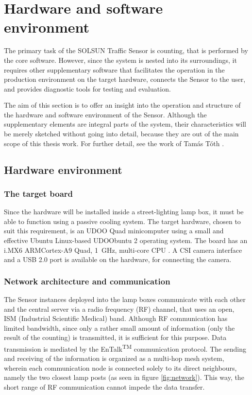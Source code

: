 \chapter{Hardware and software environment}\label{chap:Environment}
The primary task of the SOLSUN Traffic Sensor is counting, that is performed by the core software.
However, since the system is nested into its surroundings, it requires other supplementary software that facilitates the operation in the production environment on the target hardware, connects the Sensor to the user, and provides diagnostic tools for testing and evaluation.

The aim of this section is to offer an insight into the operation and structure of the hardware and software environment of the Sensor.
Although the supplementary elements are integral parts of the system, their characteristics will be merely sketched without going into detail, because they are out of the main scope of this thesis work.
For further detail, see the work of Tam{\'a}s T{\'o}th \cite{Toth2016}.
\section{Hardware environment}
\subsection{The target board}
Since the hardware will be installed inside a street-lighting lamp box, it must be able to function using a passive cooling system.
The target hardware, chosen to suit this requirement, is an UDOO Quad minicomputer using a small and effective Ubuntu Linux-based UDOObuntu 2 operating system.
The board has an i.MX6 ARM\reg Cortex\reg-A9 Quad, \SI{1}{GHz}, multi-core CPU \cite{UDOO, UDOO2}.
A CSI camera interface and a USB 2.0 port is available on the hardware, for connecting the camera.

\subsection{Network architecture and communication}
The Sensor instances deployed into the lamp boxes communicate with each other and the central server via a radio frequency (RF) channel, that uses an open, ISM (Industrial Scientific Medical) band.
Although RF communication has limited bandwidth, since only a rather small amount of information (only the result of the counting) is transmitted, it is sufficient for this purpose.
Data transmission is mediated by the EnTalk\textsuperscript{TM} communication protocol\cite{EnTalk}.
The sending and receiving of the information is organized as a multi-hop mesh system, wherein each communication node is connected solely to its direct neighbours, namely the two closest lamp posts (as seen in figure \ref{fig:network}).
This way, the short range of RF communication cannot impede the data transfer.

